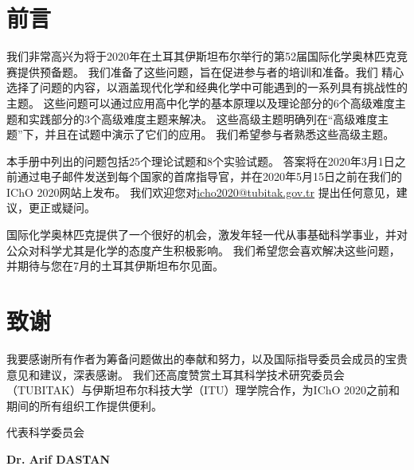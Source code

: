 \documentclass[12pt]{report}
\begin{document}
\newpage
\section*{前言}
我们非常高兴为将于2020年在土耳其伊斯坦布尔举行的第52届国际化学奥林匹克竞赛提供预备题。 我们准备了这些问题，旨在促进参与者的培训和准备。我们 精心选择了问题的内容，以涵盖现代化学和经典化学中可能遇到的一系列具有挑战性的主题。 这些问题可以通过应用高中化学的基本原理以及理论部分的6个高级难度主题和实践部分的3个高级难度主题来解决。 这些高级主题明确列在“高级难度主题”下，并且在试题中演示了它们的应用。 我们希望参与者熟悉这些高级主题。

本手册中列出的问题包括25个理论试题和8个实验试题。 答案将在2020年3月1日之前通过电子邮件发送到每个国家的首席指导官，并在2020年5月15日之前在我们的IChO 2020网站上发布。 我们欢迎您对\href{icho2020@tubitak.gov.tr}{icho2020@tubitak.gov.tr} 提出任何意见，建议，更正或疑问。

国际化学奥林匹克提供了一个很好的机会，激发年轻一代从事基础科学事业，并对公众对科学尤其是化学的态度产生积极影响。 我们希望您会喜欢解决这些问题，并期待与您在7月的土耳其伊斯坦布尔见面。

\section*{致谢}

我要感谢所有作者为筹备问题做出的奉献和努力，以及国际指导委员会成员的宝贵意见和建议，深表感谢。 我们还高度赞赏土耳其科学技术研究委员会（TUBITAK）与伊斯坦布尔科技大学（ITU）理学院合作，为IChO 2020之前和期间的所有组织工作提供便利。

\noindent
代表科学委员会

\noindent
\textbf{Dr. Arif DASTAN}
\newpage

\tableofcontents    %
\end{document}
